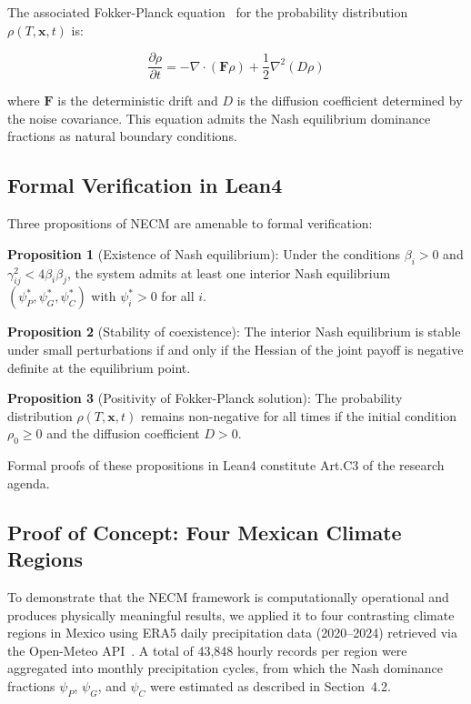 \documentclass[gmd, manuscript]{copernicus}
\begin{document}
The associated Fokker-Planck equation~\citep{Risken1989,Gardiner2004} for the probability distribution
$\rho(T,\mathbf{x},t)$ is:

\begin{equation}
\frac{\partial\rho}{\partial t} = -\nabla\cdot(\mathbf{F}\rho)
  + \frac{1}{2}\nabla^2(D\rho)
\end{equation}

where $\mathbf{F}$ is the deterministic drift and $D$ is the diffusion
coefficient determined by the noise covariance. This equation admits
the Nash equilibrium dominance fractions as natural boundary conditions.

\subsection{Formal Verification in Lean4}

Three propositions of NECM are amenable to formal verification:

\textbf{Proposition 1} (Existence of Nash equilibrium): Under the
conditions $\beta_i > 0$ and $\gamma_{ij}^2 < 4\beta_i\beta_j$,
the system admits at least one interior Nash equilibrium
$(\psi_P^*, \psi_G^*, \psi_C^*)$ with $\psi_i^* > 0$ for all $i$.

\textbf{Proposition 2} (Stability of coexistence): The interior Nash
equilibrium is stable under small perturbations if and only if the
Hessian of the joint payoff is negative definite at the equilibrium
point.

\textbf{Proposition 3} (Positivity of Fokker-Planck solution): The
probability distribution $\rho(T,\mathbf{x},t)$ remains non-negative
for all times if the initial condition $\rho_0 \geq 0$ and the
diffusion coefficient $D > 0$.

Formal proofs of these propositions in Lean4 constitute Art.C3 of the
research agenda.



\subsection{Proof of Concept: Four Mexican Climate Regions}

To demonstrate that the NECM framework is computationally operational
and produces physically meaningful results, we applied it to four
contrasting climate regions in Mexico using ERA5 daily precipitation
data (2020--2024) retrieved via the Open-Meteo API~\citep{Hersbach2020}.
A total of 43,848 hourly records per region were aggregated into monthly
precipitation cycles, from which the Nash dominance fractions
$\psi_P$, $\psi_G$, and $\psi_C$ were estimated as described in
Section~4.2.
\end{document}

